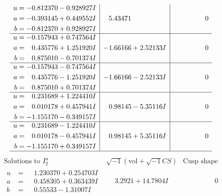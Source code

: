 \documentclass[1p]{elsarticle_modified}
\theoremstyle{definition}
\newcommand{\I}{\sqrt{-1}}
\begin{document}
$$\begin{array}{c|c|c}
\begin{aligned}
u &= -0.812370 - 0.928927 I \\
a &= -0.393145 + 0.449552 I \\
b &= -0.812370 + 0.928927 I\end{aligned}
 & \phantom{-}5.43471\phantom{ +0.000000I} & \phantom{-0.000000 } 0 \\ \hline\begin{aligned}
u &= -0.157943 + 0.747564 I \\
a &= \phantom{-}0.435776 + 1.251920 I \\
b &= \phantom{-}0.875010 - 0.701374 I\end{aligned}
 & -1.66166 + 2.52133 I & \phantom{-0.000000 } 0 \\ \hline\begin{aligned}
u &= -0.157943 - 0.747564 I \\
a &= \phantom{-}0.435776 - 1.251920 I \\
b &= \phantom{-}0.875010 + 0.701374 I\end{aligned}
 & -1.66166 - 2.52133 I & \phantom{-0.000000 } 0 \\ \hline\begin{aligned}
u &= \phantom{-}0.231689 + 1.224410 I \\
a &= \phantom{-}0.010178 + 0.457941 I \\
b &= -1.155170 - 0.349157 I\end{aligned}
 & \phantom{-}0.98145 - 5.35116 I & \phantom{-0.000000 } 0 \\ \hline\begin{aligned}
u &= \phantom{-}0.231689 - 1.224410 I \\
a &= \phantom{-}0.010178 - 0.457941 I \\
b &= -1.155170 + 0.349157 I\end{aligned}
 & \phantom{-}0.98145 + 5.35116 I & \phantom{-0.000000 } 0\\
 \hline 
 \end{array}$$\newpage$$\begin{array}{c|c|c}  
\text{Solutions to }I^u_{2}& \I (\text{vol} + \sqrt{-1}CS) & \text{Cusp shape}\\
 \hline 
\begin{aligned}
u &= \phantom{-}1.230370 + 0.254703 I \\
a &= \phantom{-}0.458305 + 0.363439 I \\
b &= \phantom{-}0.55533 - 1.31007 I\end{aligned}
 & \phantom{-}3.2921 + 14.7804 I & \phantom{-0.000000 } 0 \\ \hline\begin{aligned}

\end{aligned}
\end{array}$$
\end{document}
